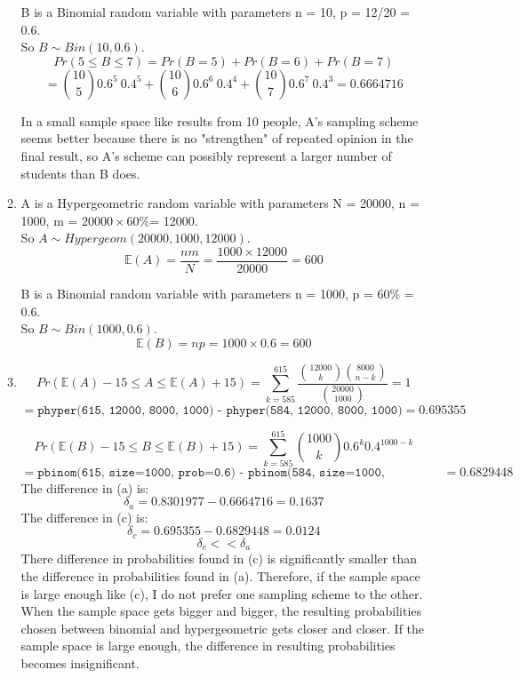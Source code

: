 \documentclass[11pt]{article}
\begin{document}
\begin{enumerate}[label=\textbf{Question \arabic*:},start=1]
\begin{enumerate}
B is a Binomial random variable with parameters n = 10, p = 12/20 = 0.6.\\
So \( B \sim Bin(10, 0.6) \). \\
\[
Pr(5 \leq B \leq 7) = Pr(B = 5) + Pr(B = 6) + Pr(B = 7) 
\]
\[
= {10 \choose 5} 0.6^5 \ 0.4^5 + {10 \choose 6} 0.6^6 \ 0.4^4 + {10 \choose 7} 0.6^7 \ 0.4^3 = 0.6664716
\]

In a small sample space like results from 10 people, A's sampling scheme seems better because there is no "strengthen" of repeated opinion in the final result, so A's scheme can possibly represent a larger number of students than B does.\\

  \item A is a Hypergeometric random variable with parameters N = 20000, n = 1000, m = \( 20000 \times 60\% \)= 12000. \\
So \( A \sim Hypergeom(20000, 1000, 12000) \).\\
\[
\mathbb{E}(A) = \frac{ n m }{N} = \frac{1000 \times 12000}{20000} = 600
\]

B is a Binomial random variable with parameters n = 1000, p = 60\% = 0.6.\\
So \( B \sim Bin(1000, 0.6) \). \\
\[
\mathbb{E}(B) = np = 1000 \times 0.6 = 600
\]

  \item 
  
\[
Pr(\mathbb{E}(A) - 15 \leq A \leq \mathbb{E}(A) + 15) = \sum_{k = 585}^{615} \frac{{12000 \choose k} {8000 \choose n-k}}{{20000 \choose 1000}} = 1
\]
\[
= \texttt{phyper(615, 12000, 8000, 1000) - phyper(584, 12000, 8000, 1000)} = 0.695355
\]

\[
Pr(\mathbb{E}(B) - 15 \leq B \leq \mathbb{E}(B) + 15) = \sum_{k = 585}^{615} {1000 \choose k} 0.6^k 0.4^{1000-k}
\]
\[
= \texttt{pbinom(615, size=1000, prob=0.6) - pbinom(584, size=1000, prob=0.6)} = 0.6829448
\]
The difference in (a) is:
\[
\delta_a = 0.8301977 - 0.6664716 = 0.1637
\]
The difference in (c) is:
\[
\delta_c = 0.695355 - 0.6829448 = 0.0124
\]
\[
\delta_c << \delta_a
\]
There difference in probabilities found in (c) is significantly smaller than the difference in probabilities found in (a).
Therefore, if the sample space is large enough like (c), I do not prefer one sampling scheme to the other. When the sample space gets bigger and bigger, the resulting probabilities chosen between binomial and hypergeometric gets closer and closer. If the sample space is large enough, the difference in resulting probabilities becomes insignificant.


\end{enumerate}
\end{enumerate}
\end{document}
